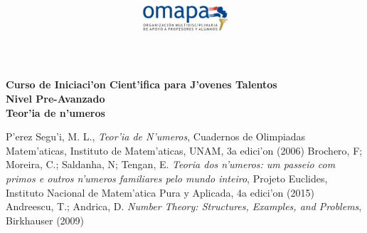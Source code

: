 \documentclass{article}
\title{
\begin{center}
\includegraphics[width=120px, height=40px]{omapa.jpg}\\
\end{center}
}
\date{}
\begin{document}
\maketitle
\begin{center}
\bfseries{Curso de Iniciaci'on Cient'ifica para J'ovenes Talentos\\
Nivel Pre-Avanzado \\
Teor'ia de n'umeros}
\end{center}



\begin{thebibliography}{99}



 P'erez Segu'i, M. L., \emph{Teor'ia de N'umeros}, Cuadernos de Olimpiadas Matem'aticas, Instituto de Matem'aticas, UNAM, 3a edici'on (2006)
 Brochero, F; Moreira, C.; Saldanha, N; Tengan, E. \emph{Teoria dos n'umeros: um passeio com primos e outros n'umeros familiares pelo mundo inteiro}, Projeto Euclides, Instituto Nacional de Matem'atica Pura y Aplicada, 4a edici'on (2015)
 Andreescu, T.; Andrica, D. \emph{Number Theory: Structures, Examples, and Problems}, Birkhauser (2009)

\end{thebibliography}
\end{document}
